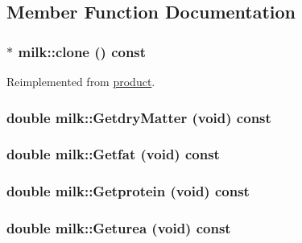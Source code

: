 \subsection{Member Function Documentation}
\hypertarget{classmilk_a185c7b47cef30f2993c339ca48af7db5}{
\subsubsection[{clone}]{ $\ast$ milk::clone () const}}
\label{classmilk_a185c7b47cef30f2993c339ca48af7db5}


Reimplemented from \hyperlink{classproduct_a18a1df87f3400774db21d1e8c573f04a}{product}.\hypertarget{classmilk_ae2e7cd84b885c21b529a48a78295967a}{
\subsubsection[{GetdryMatter}]{\setlength{\rightskip}{0pt plus 5cm}double milk::GetdryMatter (void) const}}
\label{classmilk_ae2e7cd84b885c21b529a48a78295967a}
\hypertarget{classmilk_a3184a49b16c5140554be2af66d254899}{
\subsubsection[{Getfat}]{\setlength{\rightskip}{0pt plus 5cm}double milk::Getfat (void) const}}
\label{classmilk_a3184a49b16c5140554be2af66d254899}
\hypertarget{classmilk_aa9b46018d36c0cb685cd185c6008ef65}{
\subsubsection[{Getprotein}]{\setlength{\rightskip}{0pt plus 5cm}double milk::Getprotein (void) const}}
\label{classmilk_aa9b46018d36c0cb685cd185c6008ef65}
\hypertarget{classmilk_aee1f5edbd82a3877995fde62a2c56abb}{
\subsubsection[{Geturea}]{\setlength{\rightskip}{0pt plus 5cm}double milk::Geturea (void) const}}

